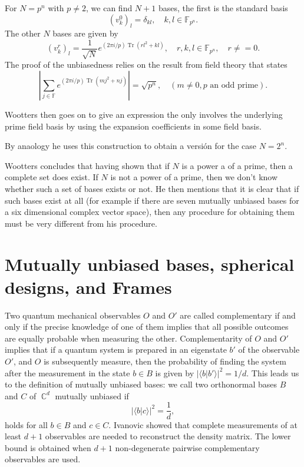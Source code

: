 \documentclass[a4paper]{article}
\DeclareMathOperator{\C}{\mathbb{C}}
\DeclareMathOperator{\Tr}{Tr}
\begin{document}
  For $N = p^{n}$ with $p \neq 2$, we can find $N+1$ bases,
  the first is the standard basis
  \[
    (v_k^0)_l = \delta_{kl},
    \quad k,l \in \mathbb F_{p^n}.
  \] 
  The other $N$ bases are given by
  \[
    (v_k^r)_l
    = \frac{1}{\sqrt{N}} e^{(2\pi i / p)\Tr(rl^2+kl)},
    \quad r,k,l \in \mathbb F_{p^n}, \quad r \neq = 0.
  \] 
  The proof of the unbiasedness relies on the result from
  field theory that states
  \[
    \left|
    \sum_{j \in \mathbb F}^{} e^{(2\pi i / p)\Tr(mj^2+nj)}
    \right|
    = \sqrt{p^n},
    \quad (m \neq 0, p \text{ an odd prime}).
  \] 
  
  Wootters then goes on to give an expression the only
  involves the underlying prime field basis by using the
  expansion coefficients in some field basis.

  By anaology he uses this construction to obtain a versión
  for the case $N = 2^{n}$.

  Wootters concludes that having shown that if $N$ is a
  power a of a prime, then a complete set does exist. If $N$ 
  is not a power of a prime, then we don't know whether such
  a set of bases exists or not. He then mentions that it is
  clear that if such bases exist at all (for example if
  there are seven mutually unbiased bases for a six
  dimensional complex vector space), then any procedure for
  obtaining them must be very different from his procedure.

  \section{Mutually unbiased bases, spherical designs, and
  Frames}

  Two quantum mechanical observables $O$ and $O'$ are called
  complementary if and only if the precise knowledge of one
  of them implies that all possible outcomes are equally
  probable when measuring the other. Complementarity of $O$ 
  and $O'$ implies that if a quantum system is prepared in
  an eigenstate $b'$ of the observable $O'$, and $O$ is
  subsequently measure, then the probability of finding the
  system after the measurement in the state $b \in B$ is
  given by $|\langle b|b' \rangle|^2 = 1 / d$. This leads us
  to the definition of mutually unbiased bases: we call two
  orthonormal bases $B$ and $C$ of $\C^{d}$ mutually
  unbiased if
  \[
    |\langle b|c \rangle|^2 = \frac{1}{d},
  \] 
  holds for all $b \in B$ and $c \in C$. Ivanovic showed
  that complete measurements of at least $d + 1$ observables
  are needed to reconstruct the density matrix. The lower
  bound is obtained when $d + 1$ non-degenerate pairwise
  complementary observables are used.
\end{document}
